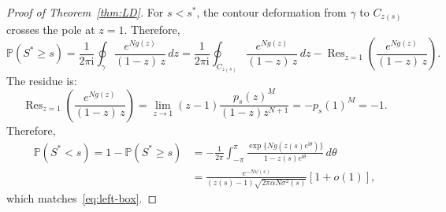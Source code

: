 \documentclass[10pt,a4paper]{amsart}
\def\PP{{\mathbb P}}
\def\PR{\mathbb{P}}
\begin{document}
\begin{proof}[{Proof of Theorem~\ref{thm:LD}}]
For $s<s^*$, the contour deformation from $\gamma$ to $C_{z(s)}$ crosses the pole at $z=1$. Therefore,
\begin{equation}
 \PR(S^*\ge s)
 =\frac{1}{2\pi \mathrm{i}}\oint_{\gamma}
  \frac{e^{Ng(z)}}{(1{-}z)\,z}\,dz= \frac{1}{2\pi \mathrm{i}}\oint_{C_{z(s)}}
  \frac{e^{Ng(z)}}{(1{-}z)\,z}\,dz-\operatorname{Res}_{z=1}\left(\frac{e^{Ng(z)}}{(1{-}z)\,z}\right) . 
\end{equation}
 The residue is:
 \begin{equation}
\operatorname{Res}_{z=1}\left(\frac{e^{Ng(z)}}{(1{-}z)\,z}\right)=\lim_{z\to 1}(z-1)\frac{p_s(z)^M}{(1-z)z^{N+1}}=-p_s(1)^M=-1.
 \end{equation}
 Therefore,
\begin{equation}
\begin{aligned}
\PP(S^*<s)=1- \PR(S^*\geq s)
&=
-\frac{1}{2\pi}
\int_{-\pi}^{\pi}
\frac{
\exp\{N g(z(s)e^{\mathrm{i}\theta})\}
}
{1-z(s)e^{\mathrm{i}\theta}}
\,d\theta  \\
&=
\frac{e^{-N\psi(s)}}{
(z(s)-1)\sqrt{2\pi\alpha N\sigma^2(s)}
}
\left[1+o(1)\right],
\end{aligned}
\end{equation}
which matches~\eqref{eq:left-box}.
\end{proof}
\end{document}
